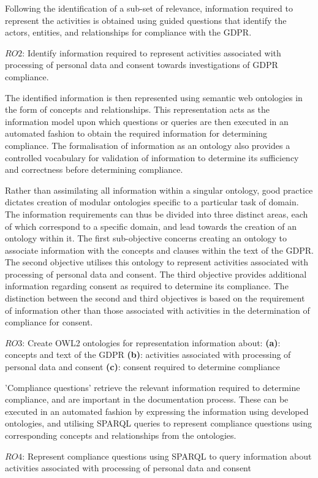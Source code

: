 Following the identification of a sub-set of relevance, information required to represent the activities is obtained using guided questions that identify the actors, entities, and relationships for compliance with the GDPR.
\begin{framed}
$RO2$: Identify information required to represent activities associated with processing of personal data and consent towards investigations of GDPR compliance.
\end{framed}

The identified information is then represented using semantic web ontologies in the form of concepts and relationships. This representation acts as the information model upon which questions or queries are then  executed in an automated fashion to obtain the required information for determining compliance. The formalisation of information as an ontology also provides a controlled vocabulary for validation of information to determine its sufficiency and correctness before determining compliance. 

Rather than assimilating all information within a singular ontology, good practice dictates creation of modular ontologies specific to a particular task of domain. The information requirements can thus be divided into three distinct areas, each of which correspond to a specific domain, and lead towards the creation of an ontology within it. The first sub-objective concerns creating an ontology to associate information with the concepts and clauses within the text of the GDPR. The second objective utilises this ontology to represent activities associated with processing of personal data and consent. The third objective provides additional information regarding consent as required to determine its compliance. The distinction between the second and third objectives is based on the requirement of information other than those associated with activities in the determination of compliance for consent.
\begin{framed}
$RO3$: Create OWL2 ontologies for representation information about:
\newline\indent\indent\textbf{(a)}: concepts and text of the GDPR
\newline\indent\indent\textbf{(b)}: activities associated with processing of personal data and consent
\newline\indent\indent\textbf{(c)}: consent required to determine compliance
\end{framed}

'Compliance questions' retrieve the relevant information required to determine compliance, and are important in the documentation process. These can be executed in an automated fashion by expressing the information using developed ontologies, and utilising SPARQL queries to represent compliance questions using corresponding concepts and relationships from the ontologies.
\begin{framed}
$RO4$: Represent compliance questions using SPARQL to query information about activities associated with processing of personal data and consent
\end{framed}

